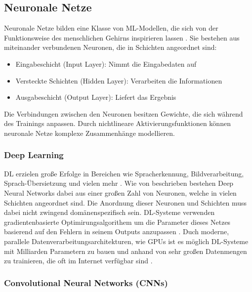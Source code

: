 \subsection{Neuronale Netze}
\label{subsec:neuronale-netze}

Neuronale Netze bilden eine Klasse von \gls{ML}-Modellen, die sich von der Funktionsweise des menschlichen Gehirns inspirieren lassen \parencite{RebalaGopinath2019AItM}. Sie bestehen aus miteinander verbundenen Neuronen, die in Schichten angeordnet sind:

\begin{itemize}
	\item Eingabeschicht (Input Layer): Nimmt die Eingabedaten auf
	\item Versteckte Schichten (Hidden Layer): Verarbeiten die Informationen
	\item Ausgabeschicht (Output Layer): Liefert das Ergebnis
\end{itemize}

Die Verbindungen zwischen den Neuronen besitzen Gewichte, die sich während des Trainings anpassen. Durch nichtlineare Aktivierungsfunktionen können neuronale Netze komplexe Zusammenhänge modellieren.

\subsubsection{Deep Learning}
\label{subsec:deep-learning}

\gls{DL} erzielen große Erfolge in Bereichen wie Spracherkennung, Bildverarbeitung, Sprach-Übersietzung und vielen mehr \parencite{RebalaGopinath2019AItM}. Wie von \textcite{RebalaGopinath2019AItM} beschrieben bestehen Deep Neural Networks dabei aus einer großen Zahl von Neuronen, welche in vielen Schichten angeordnet sind. Die Anordnung dieser Neuronen und Schichten muss dabei nicht zwingend domänenspezifisch sein. \gls{DL}-Systeme verwenden gradientenbasierte Optimirungsalgorithem um die Parameter dieses Netzes basierend auf den Fehlern in seinem Outputs anzupassen \parencite{jordan2015machine}. Duch moderne, parallele Datenverarbeitungsarchitekturen, wie \glspl{GPU} ist es möglich \gls{DL}-Systeme mit Milliarden Parametern zu bauen und anhand von sehr großen Datenmengen zu trainieren, die oft im Internet verfügbar sind \parencite{jordan2015machine}.

\subsubsection{Convolutional Neural Networks (CNNs)}
\label{subsubsec:cnn}

